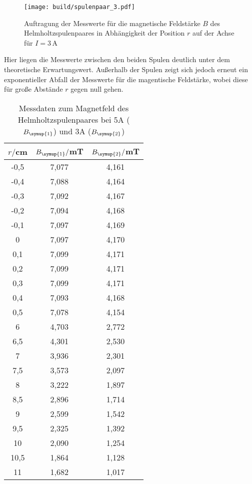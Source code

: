 \begin{figure}
  \centering
  \texttt{[image: build/spulenpaar\_3.pdf]}
  \caption{Auftragung der Messwerte für die magnetische Feldstärke $B$ des Helmholtzspulenpaares
  in Abhängigkeit der Position $r$ auf der Achse für $I=3$\,A}
  \label{fig:spulenpaar_3}
\end{figure}

Hier liegen die Messwerte zwischen den beiden Spulen deutlich unter dem
theoretische Erwartungswert. Außerhalb der Spulen zeigt sich jedoch erneut ein
exponentieller Abfall der Messwerte für die magentische Feldstärke, wobei diese für
große Abstände $r$ gegen null gehen.


\begin{table}
  \centering
  \caption{Messdaten zum Magnetfeld des Helmholtzspulenpaares bei 5A ($B_{\symup{1}}$)
  und 3A ($B_{\symup{2}}$)}
  \label{tab:helmholtz}
  \begin{tabular}{c c c}
    \toprule
    $r/$cm & $B_{\symup{1}}/$mT & $B_{\symup{2}}/$mT\\
    \midrule
    -0,5	&  7,077 & 4,161\\
    -0,4	&  7,088 & 4,164\\
    -0,3	&  7,092 & 4,167\\
    -0,2	&  7,094 & 4,168\\
    -0,1	&  7,097 & 4,169\\
    0	    &  7,097 & 4,170\\
    0,1	  &  7,099 & 4,171\\
    0,2	  &  7,099 & 4,171\\
    0,3	  &  7,099 & 4,171\\
    0,4	  &  7,093 & 4,168\\
    0,5	  &  7,078 & 4,154\\
    6	    &  4,703 & 2,772\\
    6,5	  &  4,301 & 2,530\\
    7	    &  3,936 & 2,301\\
    7,5	  &  3,573 & 2,097\\
    8	    &  3,222 & 1,897\\
    8,5	  &  2,896 & 1,714\\
    9	    &  2,599 & 1,542\\
    9,5 	&  2,325 & 1,392\\
    10	  &  2,090 & 1,254\\
    10,5	&  1,864 & 1,128\\
    11	  &  1,682 & 1,017\\

\end{tabular}
\end{table}
